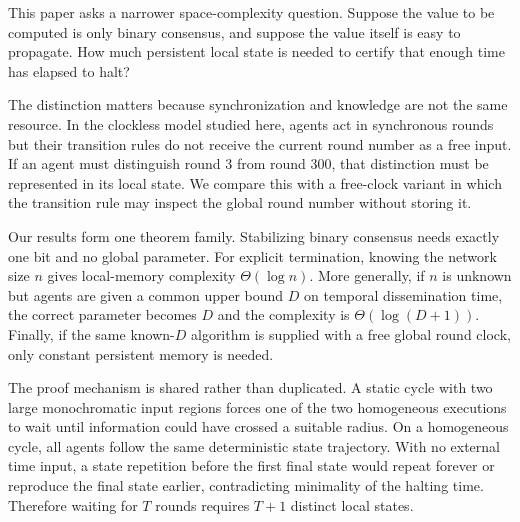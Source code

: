 \documentclass[11pt]{article}
\theoremstyle{remark}
\begin{document}
This paper asks a narrower space-complexity question. Suppose the value to be computed is only binary consensus, and suppose the value itself is easy to propagate. How much persistent local state is needed to certify that enough time has elapsed to halt?

The distinction matters because synchronization and knowledge are not the same resource. In the clockless model studied here, agents act in synchronous rounds but their transition rules do not receive the current round number as a free input. If an agent must distinguish round $3$ from round $300$, that distinction must be represented in its local state. We compare this with a free-clock variant in which the transition rule may inspect the global round number without storing it.

Our results form one theorem family. Stabilizing binary consensus needs exactly one bit and no global parameter. For explicit termination, knowing the network size $n$ gives local-memory complexity $\Theta(\log n)$. More generally, if $n$ is unknown but agents are given a common upper bound $D$ on temporal dissemination time, the correct parameter becomes $D$ and the complexity is $\Theta(\log(D+1))$. Finally, if the same known-$D$ algorithm is supplied with a free global round clock, only constant persistent memory is needed.

The proof mechanism is shared rather than duplicated. A static cycle with two large monochromatic input regions forces one of the two homogeneous executions to wait until information could have crossed a suitable radius. On a homogeneous cycle, all agents follow the same deterministic state trajectory. With no external time input, a state repetition before the first final state would repeat forever or reproduce the final state earlier, contradicting minimality of the halting time. Therefore waiting for $T$ rounds requires $T+1$ distinct local states.
\end{document}
